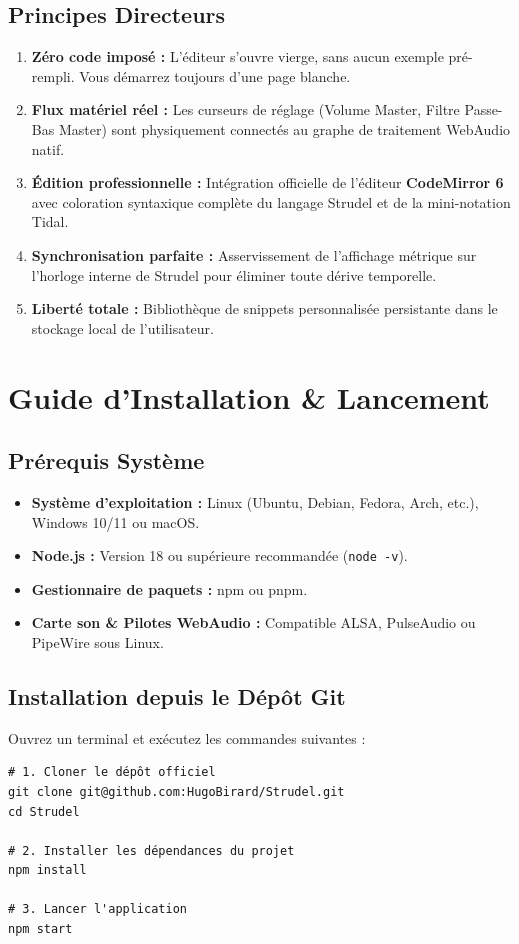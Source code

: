 \documentclass[a4paper,10pt]{article}
\begin{document}
\subsection{Principes Directeurs}
\begin{enumerate}
    \item \textbf{Zéro code imposé :} L'éditeur s'ouvre vierge, sans aucun exemple pré-rempli. Vous démarrez toujours d'une page blanche.
    \item \textbf{Flux matériel réel :} Les curseurs de réglage (Volume Master, Filtre Passe-Bas Master) sont physiquement connectés au graphe de traitement WebAudio natif.
    \item \textbf{Édition professionnelle :} Intégration officielle de l'éditeur \textbf{CodeMirror 6} avec coloration syntaxique complète du langage Strudel et de la mini-notation Tidal.
    \item \textbf{Synchronisation parfaite :} Asservissement de l'affichage métrique sur l'horloge interne de Strudel pour éliminer toute dérive temporelle.
    \item \textbf{Liberté totale :} Bibliothèque de snippets personnalisée persistante dans le stockage local de l'utilisateur.
\end{enumerate}

\section{Guide d'Installation \& Lancement}

\subsection{Prérequis Système}
\begin{itemize}
    \item \textbf{Système d'exploitation :} Linux (Ubuntu, Debian, Fedora, Arch, etc.), Windows 10/11 ou macOS.
    \item \textbf{Node.js :} Version 18 ou supérieure recommandée (\texttt{node -v}).
    \item \textbf{Gestionnaire de paquets :} npm ou pnpm.
    \item \textbf{Carte son \& Pilotes WebAudio :} Compatible ALSA, PulseAudio ou PipeWire sous Linux.
\end{itemize}

\subsection{Installation depuis le Dépôt Git}
Ouvrez un terminal et exécutez les commandes suivantes :
\begin{verbatim}
# 1. Cloner le dépôt officiel
git clone git@github.com:HugoBirard/Strudel.git
cd Strudel

# 2. Installer les dépendances du projet
npm install

# 3. Lancer l'application
npm start
\end{verbatim}
\end{document}
